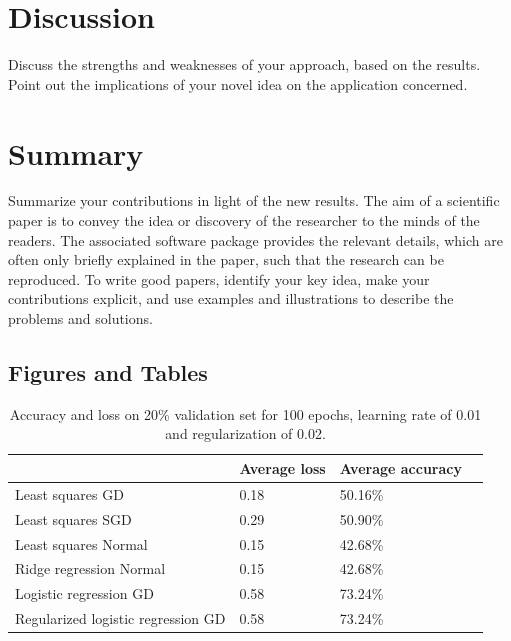 \documentclass[10pt,conference,compsocconf]{IEEEtran}
\begin{document}
\section{Discussion}\label{sec: discussion}
    Discuss the strengths and weaknesses of your
    approach, based on the results. Point out the implications of your
    novel idea on the application concerned.
\section{Summary}\label{sec: summary}
    Summarize your contributions in light of the new
    results.
    The aim of a scientific paper is to convey the idea or discovery of
    the researcher to the minds of the readers. The associated software
    package provides the relevant details, which are often only briefly
    explained in the paper, such that the research can be reproduced.
    To write good papers, identify your key idea, make your contributions
    explicit, and use examples and illustrations to describe the problems
    and solutions.
\subsection{Figures and Tables}
\begin{table}[htbp]
  \centering
  \begin{tabular}[c]{|l||l|l|l|}
    \hline
    &Average loss&Average accuracy \\
    \hline
    Least squares GD & 0.18 & 50.16\% \\
    Least squares SGD & 0.29 & 50.90\%\\
    Least squares Normal & 0.15 & 42.68\%\\
    Ridge regression Normal & 0.15 & 42.68\%\\
    Logistic regression GD & 0.58 & 73.24\%\\
    Regularized logistic regression GD & 0.58 & 73.24\% \\
    \hline
  \end{tabular}
  \caption{Accuracy and loss on 20\% validation set for 100 epochs, learning rate of 0.01 and regularization of 0.02. }
  \label{tab:basic_training}
\end{table}
\end{document}
